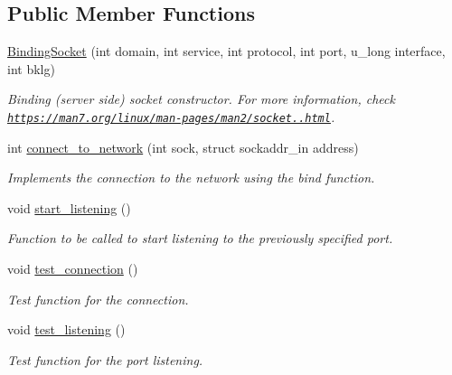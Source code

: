\subsection*{Public Member Functions}
\begin{DoxyCompactItemize}
\item 
\hyperlink{classBindingSocket_aee27b67c01411fa363865e92310b015c}{Binding\+Socket} (int domain, int service, int protocol, int port, u\+\_\+long interface, int bklg)
\begin{DoxyCompactList}\small\item\em Binding (server side) socket constructor. For more information, check \href{https://man7.org/linux/man-pages/man2/socket.2.html}{\tt https\+://man7.\+org/linux/man-\/pages/man2/socket..\+html}. \end{DoxyCompactList}\item 
int \hyperlink{classBindingSocket_a02a8a46a6a5d5c3205d53f2a9840455a}{connect\+\_\+to\+\_\+network} (int sock, struct sockaddr\+\_\+in address)
\begin{DoxyCompactList}\small\item\em Implements the connection to the network using the bind function. \end{DoxyCompactList}\item 
\mbox{\label{classBindingSocket_add8fecb2aa76c3c81bb65861973c487a}} 
void \hyperlink{classBindingSocket_add8fecb2aa76c3c81bb65861973c487a}{start\+\_\+listening} ()
\begin{DoxyCompactList}\small\item\em Function to be called to start listening to the previously specified port. \end{DoxyCompactList}\item 
\mbox{\label{classBindingSocket_a76086880c62746d2247befee6a3fe68f}} 
void \hyperlink{classBindingSocket_a76086880c62746d2247befee6a3fe68f}{test\+\_\+connection} ()
\begin{DoxyCompactList}\small\item\em Test function for the connection. \end{DoxyCompactList}\item 
\mbox{\label{classBindingSocket_aa24ab4e79fd3b30b415b3e96eae14a83}} 
void \hyperlink{classBindingSocket_aa24ab4e79fd3b30b415b3e96eae14a83}{test\+\_\+listening} ()
\begin{DoxyCompactList}\small\item\em Test function for the port listening. \end{DoxyCompactList}\item 

\end{DoxyCompactItemize}
